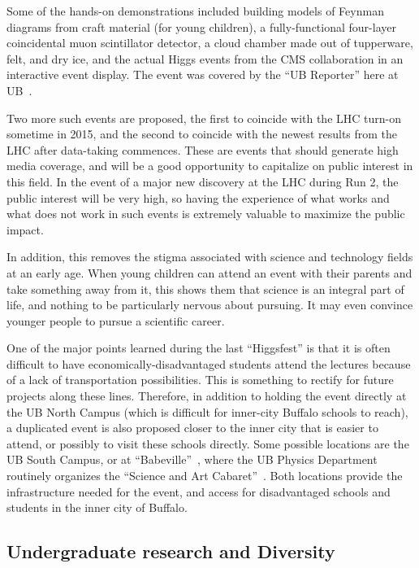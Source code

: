 \documentclass[times,11pt]{article}
\begin{document}
Some of the hands-on demonstrations included building models of
Feynman diagrams from craft material (for young children), a
fully-functional four-layer coincidental muon scintillator detector,
a cloud chamber made out of tupperware, felt, and dry ice, and the
actual Higgs events from the CMS collaboration in an interactive event
display. 
The event was covered by the ``UB Reporter'' here at
UB~\cite{higgsfest_ubreporter}. 

Two more such events are proposed, the first to coincide with the LHC
turn-on sometime in 2015, and the second to coincide with the newest
results from the LHC after data-taking commences. These are 
events that should generate high media coverage, and will be a good
opportunity to capitalize on public interest in this field.
In the event of a major new discovery at the LHC
during Run 2, the public interest will be very high, so having the
experience of what works and what does not work in such events is
extremely valuable to maximize the public impact. 

In addition, this removes the stigma associated with science and
technology fields at an early age. When young children can attend an
event with their parents and take something away from it, this shows
them that science is an integral part of life, and nothing to be
particularly nervous about pursuing. It may even convince younger
people to pursue a scientific career. 

One of the major points learned during the last ``Higgsfest''
is that it is often difficult to have economically-disadvantaged
students attend the lectures because of a lack of transportation
possibilities. This is something to rectify for future
projects along these lines. Therefore, in addition to holding the
event directly
at the UB North Campus (which is difficult for inner-city
Buffalo schools to reach), a duplicated event is also proposed
closer to the inner city that is easier to attend, or possibly to
visit these schools directly. Some possible
locations are the UB South Campus, or at
``Babeville''~\cite{babeville}, where the UB Physics
Department routinely organizes the ``Science and Art
Cabaret''~\cite{cabaret}. Both locations 
provide the infrastructure needed for the event, and
access for disadvantaged schools and students in the inner city of
Buffalo. 




\subsection{Undergraduate research and Diversity}
\end{document}
